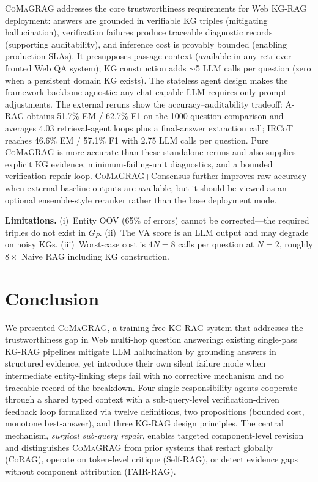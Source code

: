\documentclass[runningheads]{llncs}
\newcommand{\sys}{\textsc{CoMaGRAG}\xspace}
\begin{document}
\sys addresses the core trustworthiness requirements for Web KG-RAG deployment:
answers are grounded in verifiable KG triples (mitigating hallucination),
verification failures produce traceable diagnostic records (supporting
auditability), and inference cost is provably bounded (enabling production
SLAs). It presupposes passage context (available in any retriever-fronted Web
QA system); KG construction adds $\sim$5 LLM calls per question (zero when a
persistent domain KG exists). The stateless agent design makes the framework
backbone-agnostic: any chat-capable LLM requires only prompt adjustments.
The external reruns show the accuracy--auditability tradeoff: A-RAG obtains
51.7\% EM / 62.7\% F1 on the 1000-question comparison and averages
4.03 retrieval-agent loops plus a final-answer extraction call; IRCoT reaches
46.6\% EM / 57.1\% F1 with 2.75 LLM calls per question. Pure \sys is more
accurate than these standalone reruns and also supplies explicit KG evidence,
minimum-failing-unit diagnostics, and a bounded verification-repair loop.
\sys+Consensus further improves raw accuracy when external baseline outputs
are available, but it should be viewed as an optional ensemble-style reranker
rather than the base deployment mode.

\textbf{Limitations.} (i)~Entity OOV (65\% of errors) cannot be
corrected---the required triples do not exist in $G_P$. (ii)~The VA score
is an LLM output and may degrade on noisy KGs. (iii)~Worst-case cost is
$4N=8$ calls per question at $N=2$, roughly $8\times$ Naive RAG including
KG construction.

\section{Conclusion}
\label{sec:conclusion}

We presented \sys, a training-free KG-RAG system that addresses the
trustworthiness gap in Web multi-hop question answering: existing single-pass
KG-RAG pipelines mitigate LLM hallucination by grounding answers in structured
evidence, yet introduce their own silent failure mode when intermediate
entity-linking steps fail with no corrective mechanism and no traceable record
of the breakdown.
Four single-responsibility agents cooperate through a shared typed context
with a sub-query-level verification-driven feedback loop formalized via twelve
definitions, two propositions (bounded cost, monotone best-answer), and three
KG-RAG design principles. The central mechanism, \emph{surgical sub-query
repair}, enables targeted component-level revision and distinguishes \sys from
prior systems that restart globally (CoRAG), operate on token-level critique
(Self-RAG), or detect evidence gaps without component attribution (FAIR-RAG).
\end{document}
